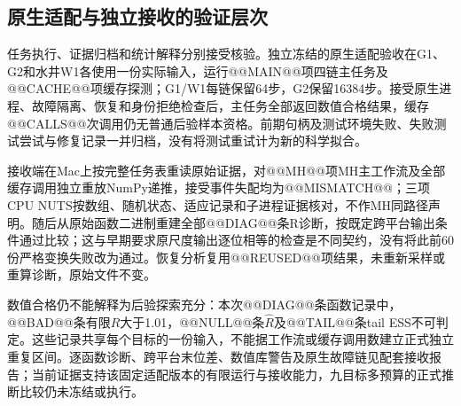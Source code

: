 \subsection{原生适配与独立接收的验证层次}
\label{sec:native-adapter-validation}
任务执行、证据归档和统计解释分别接受核验。独立冻结的原生适配验收在G1、G2和水井W1各使用一份实际输入，运行@@MAIN@@项四链主任务及@@CACHE@@项缓存探测；G1/W1每链保留64步，G2保留16384步。接受原生进程、故障隔离、恢复和身份拒绝检查后，主任务全部返回数值合格结果，缓存@@CALLS@@次调用仍无普通后验样本资格。前期句柄及测试环境失败、失败测试尝试与修复记录一并归档，没有将测试重试计为新的科学拟合。

接收端在Mac上按完整任务表重读原始证据，对@@MH@@项MH主工作流及全部缓存调用独立重放NumPy递推，接受事件失配均为@@MISMATCH@@；三项CPU NUTS按数组、随机状态、适应记录和子进程证据核对，不作MH同路径声明。随后从原始函数二进制重建全部@@DIAG@@条R诊断，按既定跨平台输出条件通过比较；这与早期要求原尺度输出逐位相等的检查是不同契约，没有将此前60份严格变换失败改为通过。恢复分析复用@@REUSED@@项结果，未重新采样或重算诊断，原始文件不变。

数值合格仍不能解释为后验探索充分：本次@@DIAG@@条函数记录中，@@BAD@@条有限$\hat R$大于1.01，@@NULL@@条$\hat R$及@@TAIL@@条tail ESS不可判定。这些记录共享每个目标的一份输入，不能据工作流或缓存调用数建立正式独立重复区间。逐函数诊断、跨平台末位差、数值库警告及原生故障链见配套接收报告；当前证据支持该固定适配版本的有限运行与接收能力，九目标多预算的正式推断比较仍未冻结或执行。

